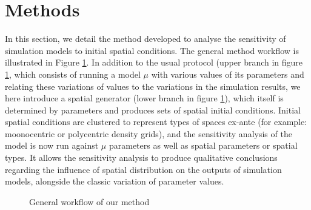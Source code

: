 \documentclass[Afour,sageh,times]{sagej}
\begin{document}
\section{Methods}


In this section, we detail the method developed to analyse the sensitivity of simulation models to initial spatial conditions. The general method workflow is illustrated in Figure \ref{fig:method}. In addition to the usual protocol (upper branch in figure \ref{fig:method}, which consists of running a model $\mu$ with various values of its parameters and relating these variations of values to the variations in the simulation results, we here introduce a spatial generator (lower branch in figure \ref{fig:method}), which itself is determined by parameters and produces sets of spatial initial conditions. Initial spatial conditions are clustered to represent types of spaces ex-ante (for example: moonocentric or polycentric density grids), and the sensitivity analysis of the model is now run against $\mu$ parameters as well as spatial parameters or spatial types. It allows the sensitivity analysis to produce qualitative conclusions regarding the influence of spatial distribution on the outputs of simulation models, alongside the classic variation of parameter values.


\begin{figure}[htbp] \begin{center} 
 \caption{General workflow of our method} \label{fig:method} \end{center} \end{figure} %
\end{document}
